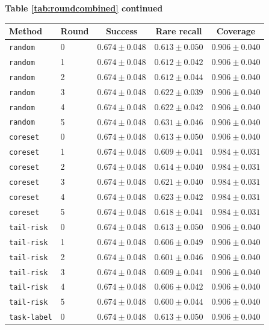 \documentclass{article}
\begin{document}
\begin{center}
\textbf{Table \ref{tab:roundcombined} continued}\\[0.4ex]
\begin{tabular}{llccc}
\toprule
Method & Round & Success & Rare recall & Coverage \\
\midrule
\texttt{random} & 0 & $0.674 \pm 0.048$ & $0.613 \pm 0.050$ & $0.906 \pm 0.040$ \\
\texttt{random} & 1 & $0.674 \pm 0.048$ & $0.612 \pm 0.042$ & $0.906 \pm 0.040$ \\
\texttt{random} & 2 & $0.674 \pm 0.048$ & $0.612 \pm 0.044$ & $0.906 \pm 0.040$ \\
\texttt{random} & 3 & $0.674 \pm 0.048$ & $0.622 \pm 0.039$ & $0.906 \pm 0.040$ \\
\texttt{random} & 4 & $0.674 \pm 0.048$ & $0.622 \pm 0.042$ & $0.906 \pm 0.040$ \\
\texttt{random} & 5 & $0.674 \pm 0.048$ & $0.631 \pm 0.046$ & $0.906 \pm 0.040$ \\
\texttt{coreset} & 0 & $0.674 \pm 0.048$ & $0.613 \pm 0.050$ & $0.906 \pm 0.040$ \\
\texttt{coreset} & 1 & $0.674 \pm 0.048$ & $0.609 \pm 0.041$ & $0.984 \pm 0.031$ \\
\texttt{coreset} & 2 & $0.674 \pm 0.048$ & $0.614 \pm 0.040$ & $0.984 \pm 0.031$ \\
\texttt{coreset} & 3 & $0.674 \pm 0.048$ & $0.621 \pm 0.040$ & $0.984 \pm 0.031$ \\
\texttt{coreset} & 4 & $0.674 \pm 0.048$ & $0.623 \pm 0.042$ & $0.984 \pm 0.031$ \\
\texttt{coreset} & 5 & $0.674 \pm 0.048$ & $0.618 \pm 0.041$ & $0.984 \pm 0.031$ \\
\texttt{tail-risk} & 0 & $0.674 \pm 0.048$ & $0.613 \pm 0.050$ & $0.906 \pm 0.040$ \\
\texttt{tail-risk} & 1 & $0.674 \pm 0.048$ & $0.606 \pm 0.049$ & $0.906 \pm 0.040$ \\
\texttt{tail-risk} & 2 & $0.674 \pm 0.048$ & $0.601 \pm 0.046$ & $0.906 \pm 0.040$ \\
\texttt{tail-risk} & 3 & $0.674 \pm 0.048$ & $0.609 \pm 0.041$ & $0.906 \pm 0.040$ \\
\texttt{tail-risk} & 4 & $0.674 \pm 0.048$ & $0.606 \pm 0.042$ & $0.906 \pm 0.040$ \\
\texttt{tail-risk} & 5 & $0.674 \pm 0.048$ & $0.600 \pm 0.044$ & $0.906 \pm 0.040$ \\
\texttt{task-label} & 0 & $0.674 \pm 0.048$ & $0.613 \pm 0.050$ & $0.906 \pm 0.040$ \\

\end{tabular}
\end{center}
\end{document}
